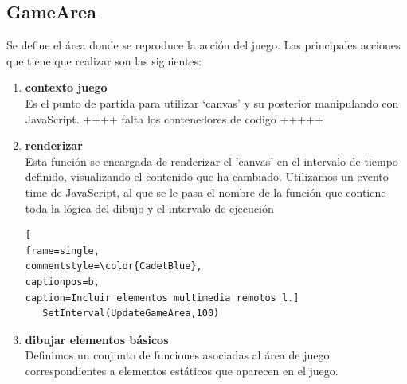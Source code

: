 \subsection{GameArea}
Se define el área donde se reproduce la acción del juego. Las principales acciones que tiene que
realizar son las siguientes:
\begin{enumerate}
\item \textbf{contexto juego} \\ Es el punto de partida para utilizar ‘canvas' y su posterior manipulando con JavaScript. ++++ falta los contenedores de codigo +++++
\item \textbf{renderizar} \\ Esta función se encargada de renderizar el 'canvas' en el intervalo de tiempo definido, visualizando
el contenido que ha cambiado. Utilizamos un evento time de JavaScript, al que se le pasa el nombre
de la función que contiene toda la lógica del dibujo y el intervalo de ejecución \lstset{language=C, breaklines=true, basicstyle=\footnotesize}
\lstset{numbers=left, numberstyle=\tiny, stepnumber=1, numbersep=-2pt}
\begin{lstlisting}[
frame=single,
commentstyle=\color{CadetBlue},
captionpos=b,
caption=Incluir elementos multimedia remotos l.]
   SetInterval(UpdateGameArea,100)
\end{lstlisting}
\item \textbf{dibujar elementos básicos} \\ Definimos un conjunto de funciones asociadas al área de juego correspondientes a elementos
estáticos que aparecen en el juego.


\end{enumerate}
